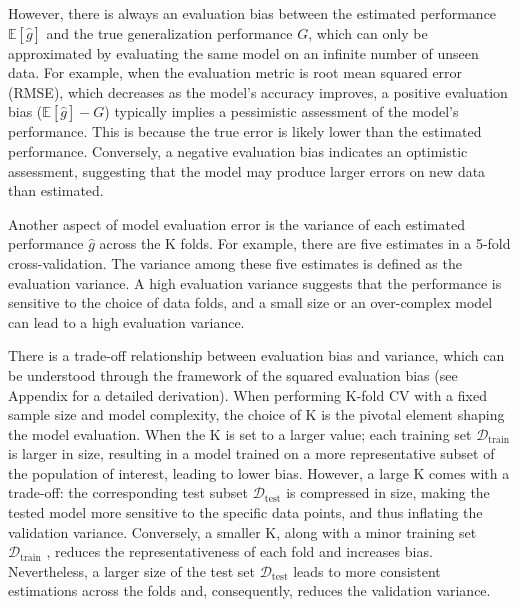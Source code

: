 However, there is always an evaluation bias between the estimated performance $\mathbb{E}[\hat{g}]$ and the true generalization performance $G$, which can only be approximated by evaluating the same model on an infinite number of unseen data. For example, when the evaluation metric is root mean squared error (RMSE), which decreases as the model’s accuracy improves, a positive evaluation bias ($\mathbb{E}[\hat{g}] - G$) typically implies a pessimistic assessment of the model’s performance. This is because the true error is likely lower than the estimated performance. Conversely, a negative evaluation bias indicates an optimistic assessment, suggesting that the model may produce larger errors on new data than estimated.

Another aspect of model evaluation error is the variance of each estimated performance $\hat{g}$ across the K folds. For example, there are five estimates in a 5-fold cross-validation. The variance among these five estimates is defined as the evaluation variance. A high evaluation variance suggests that the performance is sensitive to the choice of data folds, and a small size or an over-complex model can lead to a high evaluation variance.

There is a trade-off relationship between evaluation bias and variance, which can be understood through the framework of the squared evaluation bias (see Appendix for a detailed derivation). When performing K-fold CV with a fixed sample size and model complexity, the choice of K is the pivotal element shaping the model evaluation. When the K is set to a larger value; each training set $\mathcal{D}_\text{train}$ is larger in size, resulting in a model trained on a more representative subset of the population of interest, leading to lower bias. However, a large K comes with a trade-off: the corresponding test subset $\mathcal{D}_\text{test}$ is compressed in size, making the tested model more sensitive to the specific data points, and thus inflating the validation variance. Conversely, a smaller K, along with a minor training set $\mathcal{D}_\text{train}$ , reduces the representativeness of each fold and increases bias. Nevertheless, a larger size of the test set $\mathcal{D}_\text{test}$ leads to more consistent estimations across the folds and, consequently, reduces the validation variance.

